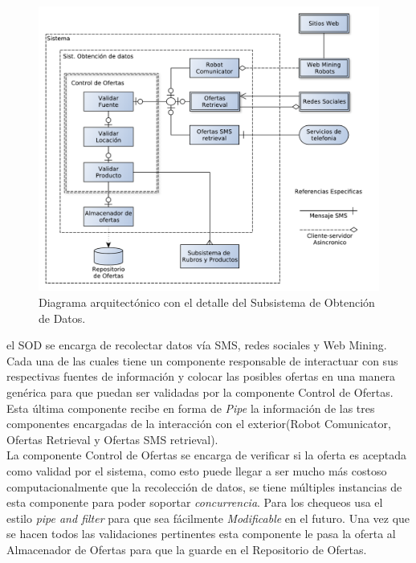 \begin{figure}[H]
	\centering
	\includegraphics[width=\textwidth]{graficos/arch/Sistema_obtenedor_datos.pdf}
	\caption{Diagrama arquitectónico con el detalle del \textsf{Subsistema de Obtención de Datos}.}
\end{figure}

el SOD se encarga de recolectar datos vía SMS, redes sociales y Web Mining. Cada una de las cuales tiene un componente responsable de interactuar con sus respectivas fuentes de información y colocar las posibles ofertas en una manera genérica para que puedan ser validadas por la componente \textsf{Control de Ofertas}. Esta última componente recibe en forma de \emph{Pipe} la información de las tres componentes encargadas de la interacción con el exterior(\textsf{Robot Comunicator}, \textsf{Ofertas Retrieval} y \textsf{Ofertas SMS retrieval}).\\

La componente \textsf{Control de Ofertas} se encarga de verificar si la oferta es aceptada como validad por el sistema, como esto puede llegar a ser mucho más costoso computacionalmente que la recolección de datos, se tiene múltiples instancias de esta componente para poder soportar \emph{concurrencia}. Para los chequeos usa el estilo \emph{pipe and filter} para que sea fácilmente \emph{Modificable} en el futuro. Una vez que se hacen todos las validaciones pertinentes esta componente le pasa la oferta al \textsf{Almacenador de Ofertas} para que la guarde en el \textsf{Repositorio de Ofertas}.\\




\\
\\
\\

